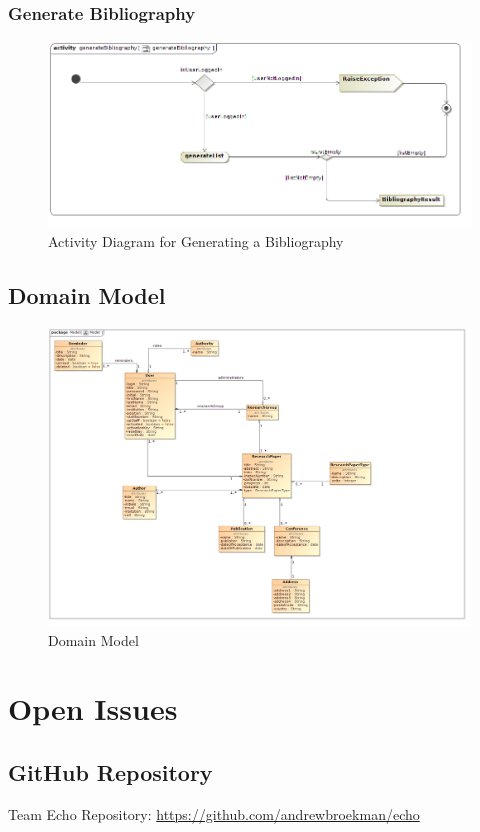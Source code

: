 \documentclass[a4paper,10pt]{article}
\begin{document}
\subsubsection{Generate Bibliography}
	\begin{figure}[H]
		\includegraphics[scale=0.5]{generateBibliographyAct}
	\caption{Activity Diagram for Generating a Bibliography}
	\end{figure}

	
	
\subsection{Domain Model}
	\begin{figure}[H]
		\includegraphics[width=7in]{DomainModel}
	\caption{Domain Model}
	\end{figure}
\section{Open Issues}
\subsection {GitHub Repository}
Team Echo Repository: \url{https://github.com/andrewbroekman/echo}
\end{document}
